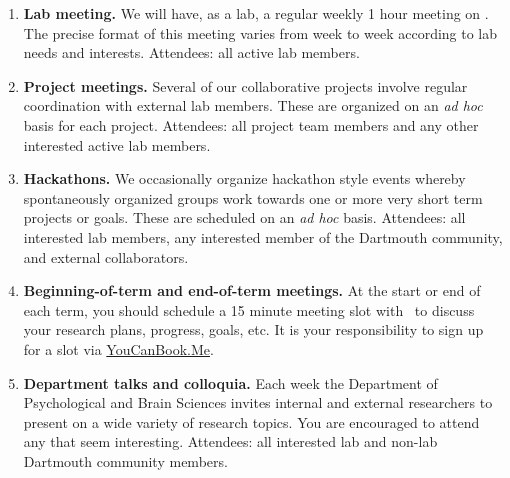 \documentclass{tufte-book} %
\begin{document}
\begin{enumerate}
\item \textbf{Lab meeting.}  We will have, as a lab, a regular weekly
  1 hour meeting on \textbf{\labmeetingtime}.  The precise
  format of this meeting varies from week to week according to lab
  needs and interests. Attendees: all active lab members.

\item \textbf{Project meetings.}  Several of our collaborative
  projects involve regular coordination with external lab members.
  These are organized on an \textit{ad hoc} basis for each project.
  Attendees: all project team members and any other interested active
  lab members.

  \item \textbf{Hackathons.}  We occasionally organize hackathon
    style events whereby spontaneously organized groups work towards
    one or more very short term projects or goals.  These are
    scheduled on an \textit{ad hoc} basis.  Attendees: all interested
    lab members, any interested member of the Dartmouth community, and
    external collaborators.


  \item \textbf{Beginning-of-term and end-of-term meetings.} At the
    start or end of each term, you should schedule a 15 minute
    meeting slot with \director~to discuss your research
    plans, progress, goals, etc.  It is your responsibility to sign up
    for a slot via \href{https://context-lab.youcanbook.me/}{YouCanBook.Me}.

\item \textbf{Department talks and colloquia.} Each week the
  Department of Psychological and Brain Sciences invites internal and
  external researchers to present on a wide variety of research
  topics.  You are encouraged to attend any that seem interesting.
  Attendees: all interested lab and non-lab Dartmouth community
  members.


\end{enumerate}
\end{document}
